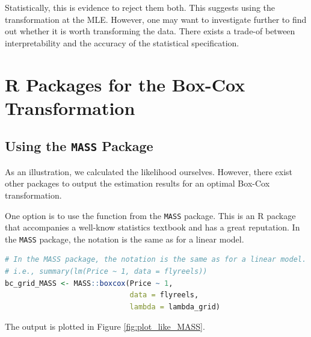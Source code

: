 \documentclass[11pt]{book}
\begin{document}
Statistically, this is evidence to reject them both.
This suggests using the transformation at the MLE.
However, one may want to investigate further 
to find out whether it is worth 
transforming the data. 
There exists a trade-of between interpretability and 
the accuracy of the statistical specification. 


\clearpage
\section{\textsf{R} Packages for the Box-Cox Transformation}
\subsection*{Using the \texttt{MASS} Package}

As an illustration, we calculated
the likelihood ourselves.
However, there exist other packages
to output the estimation results for
an optimal Box-Cox transformation.

One option is to use the function from the \texttt{MASS} package.
This is an \textsf{R} package that accompanies a well-know statistics textbook
and has a great reputation. 
In the \texttt{MASS} package, the notation is the same as for a linear model.


\begin{lstlisting}[language=R]
# In the MASS package, the notation is the same as for a linear model.
# i.e., summary(lm(Price ~ 1, data = flyreels))
bc_grid_MASS <- MASS::boxcox(Price ~ 1,
                             data = flyreels,
                             lambda = lambda_grid)
\end{lstlisting}

The output is plotted in Figure \ref{fig:plot_like_MASS}.
\end{document}
